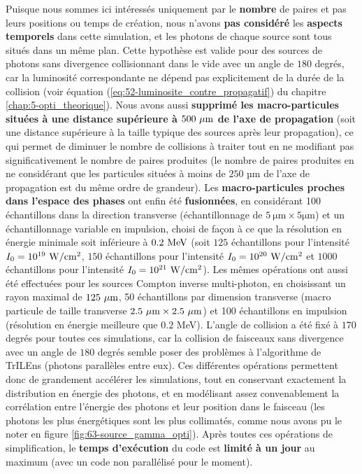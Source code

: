 \begin{refsection}
Puisque nous sommes ici intéressés uniquement par le \textbf{nombre} de paires et pas leurs positions ou temps de création, nous n'avons \textbf{pas considéré} les \textbf{aspects temporels} dans cette simulation, et les photons de chaque source sont tous situés dans un même plan. Cette hypothèse est valide pour des sources de photons sans divergence collisionnant dans le vide avec un angle de $180$ degrés, car la luminosité correspondante ne dépend pas explicitement de la durée de la collision (voir équation (\ref{eq:52-luminosite_contre_propagatif}) du chapitre \ref{chap:5-opti_theorique}). Nous avons aussi \textbf{supprimé les macro-particules situées à une distance supérieure à $500 ~ \rm \mu m$ de l'axe de propagation} (soit une distance supérieure à la taille typique des sources après leur propagation), ce qui permet de diminuer le nombre de collisions à traiter tout en ne modifiant pas significativement le nombre de paires produites (le nombre de paires produites en ne considérant que les particules situées à moins de $250$ µm de l'axe de propagation est du même ordre de grandeur). Les \textbf{macro-particules proches dans l'espace des phases} ont enfin été \textbf{fusionnées}, en considérant 100 échantillons dans la direction transverse (échantillonnage de $5 ~ \si{\um} \times 5 \si{\um}$) et un échantillonnage variable en impulsion, choisi de façon à ce que la résolution en énergie minimale soit inférieure à $0.2 ~ \rm MeV$ (soit $125$ échantillons pour l'intensité $I_0=10^{19} ~ \rm W/cm^2$, $150$ échantillons pour l'intensité $I_0=10^{20} ~ \rm W/cm^2$ et $1000$ échantillons pour l'intensité $I_0=10^{21} ~ \rm W/cm^2$). 
Les mêmes opérations ont aussi été effectuées pour les sources Compton inverse multi-photon, en choisissant un rayon maximal de $125 ~ \rm \mu m$, 50 échantillons par dimension transverse (macro particule de taille transverse $2.5 ~ \rm \mu m \times 2.5 ~ \rm \mu m$) et 100 échantillons en impulsion (résolution en énergie meilleure que $0.2$ MeV). 
L'angle de collision a été fixé à $170$ degrés pour toutes ces simulations, car la collision de faisceaux sans divergence avec un angle de $180$ degrés semble poser des problèmes à l'algorithme de TrILEns (photons parallèles entre eux). Ces différentes opérations permettent donc de grandement accélérer les simulations, tout en conservant exactement la distribution en énergie des photons, et en modélisant assez convenablement la corrélation entre l'énergie des photons et leur position dans le faisceau (les photons les plus énergétiques sont les plus collimatés, comme nous avons pu le noter en figure \ref{fig:63-source_gamma_opti}).
Après toutes ces opérations de simplification, le \textbf{temps d'exécution} du code est \textbf{limité à un jour} au maximum (avec un code non parallélisé pour le moment).


\end{refsection}
